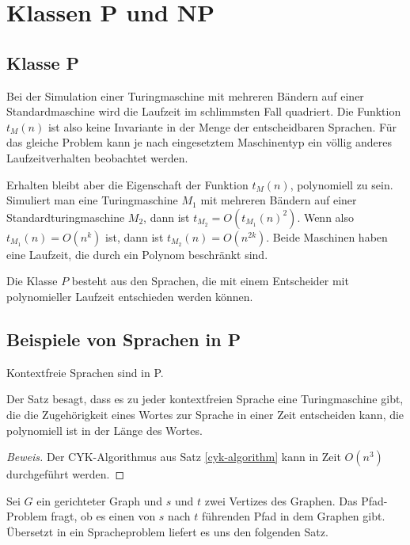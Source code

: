 %
%
%
\section{Klassen P und NP}
%
\subsection{Klasse P}
Bei der Simulation einer Turingmaschine mit mehreren Bändern
auf einer Standardmaschine wird die Laufzeit im schlimmsten
Fall quadriert.
Die Funktion $t_M(n)$ ist also keine Invariante
in der Menge der entscheidbaren Sprachen.
Für das gleiche Problem kann je nach eingesetztem Maschinentyp ein
völlig anderes Laufzeitverhalten beobachtet werden.

Erhalten bleibt aber die Eigenschaft der Funktion $t_M(n)$, 
polynomiell zu sein.
Simuliert man eine Turingmaschine $M_1$ mit
mehreren Bändern auf einer Standardturingmaschine $M_2$,
dann ist $t_{M_2}=O(t_{M_1}(n)^2)$.
Wenn also $t_{M_1}(n)=O(n^k)$ ist, dann ist $t_{M_2}(n)=O(n^{2k}).$
Beide Maschinen haben eine Laufzeit, die durch ein Polynom beschränkt
sind.

\begin{definition}
%
Die Klasse $P$ besteht aus den Sprachen, die mit einem Entscheider
mit polynomieller Laufzeit entschieden werden können.
\end{definition}

\subsection{Beispiele von Sprachen in P}
%
\begin{satz}
Kontextfreie Sprachen sind in P.
\end{satz}

Der Satz besagt, dass es zu jeder kontextfreien Sprache eine
Turingmaschine gibt, die die Zugehörigkeit eines Wortes zur
Sprache in einer Zeit entscheiden kann, die polynomiell ist in
der Länge des Wortes.

\begin{proof}[Beweis]
Der CYK-Algorithmus aus Satz \ref{cyk-algorithm}
kann in Zeit $O(n^3)$ durchgeführt werden.
\end{proof}

Sei $G$ ein gerichteter Graph und $s$ und $t$ zwei Vertizes
des Graphen.
Das Pfad-Problem fragt, ob es einen von $s$ nach $t$
führenden Pfad in dem Graphen gibt.
Übersetzt in ein Spracheproblem liefert es uns den folgenden Satz.

